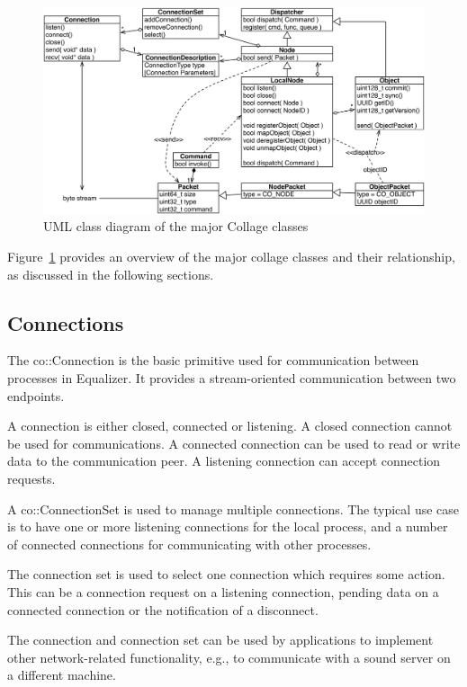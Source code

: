 \documentclass[10pt,a4]{scrartcl}
\newcommand{\fig}[1]{Figure~\ref{#1}}
\begin{document}
\begin{figure}[ht!]\center
  \includegraphics[width=\textwidth]{images/collageUML}
  {\caption{\label{fCollageUML}UML class diagram of the major Collage classes}}
\end{figure}
\fig{fCollageUML} provides an overview of the major collage classes and their
relationship, as discussed in the following sections.

\subsection{Connections}

The \textsf{co::Connection} is the basic primitive used for communication
between processes in Equalizer. It provides a stream-oriented communication
between two endpoints.

A connection is either closed, connected or listening. A closed connection
cannot be used for communications. A connected connection can be used to read or
write data to the communication peer. A listening connection can accept
connection requests.

A \textsf{co::ConnectionSet} is used to manage multiple connections. The
typical use case is to have one or more listening connections for the local
process, and a number of connected connections for communicating with other
processes.

The connection set is used to select one connection which requires some
action. This can be a connection request on a listening connection, pending data
on a connected connection or the notification of a disconnect.

The connection and connection set can be used by applications to implement other
network-related functionality, e.g., to communicate with a sound server on a
different machine.
\end{document}
